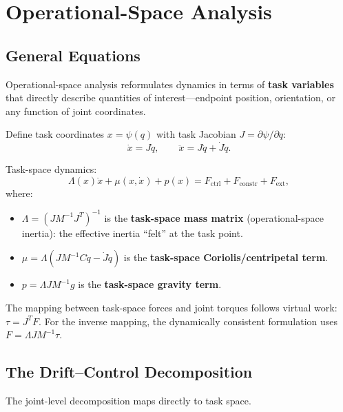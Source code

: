 \documentclass[11pt]{article}
\begin{document}
\section{Operational-Space Analysis}\label{sec:operational-space}

\subsection{General Equations}

Operational-space analysis reformulates dynamics in terms of \textbf{task variables} that directly describe quantities of interest---endpoint position, orientation, or any function of joint coordinates.

Define task coordinates $x=\psi(q)$ with task Jacobian $J=\partial\psi/\partial q$:
\begin{equation}\label{eq:os-kinematics}
\dot{x}=J\dot{q}, \qquad \ddot{x}=J\ddot{q}+\dot{J}\dot{q}.
\end{equation}

Task-space dynamics:
\begin{equation}\label{eq:os-dynamics}
\Lambda(x)\ddot{x}+\mu(x,\dot{x})+p(x) = F_{\mathrm{ctrl}}+F_{\mathrm{constr}}+F_{\mathrm{ext}},
\end{equation}
where:
\begin{itemize}
\item $\Lambda=(JM^{-1}J^T)^{-1}$ is the \textbf{task-space mass matrix} (operational-space inertia): the effective inertia ``felt'' at the task point.
\item $\mu=\Lambda(JM^{-1}C\dot{q}-\dot{J}\dot{q})$ is the \textbf{task-space Coriolis/centripetal term}.
\item $p=\Lambda JM^{-1}g$ is the \textbf{task-space gravity term}.
\end{itemize}

The mapping between task-space forces and joint torques follows virtual work: $\tau = J^T F$.
For the inverse mapping, the dynamically consistent formulation uses $F = \Lambda J M^{-1}\tau$.

\subsection{The Drift--Control Decomposition}

The joint-level decomposition maps directly to task space.
\end{document}
